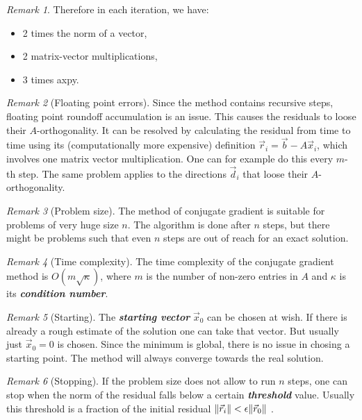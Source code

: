 \documentclass{article}
\theoremstyle{plain} %
\theoremstyle{remark} %
\newtheorem*{remark}{Remark} %
\def\df#1{\textbf{\textit{#1}}}
\numberwithin{equation}{section}
\begin{document}
\begin{remark}
    Therefore in each iteration, we have:
    \begin{itemize}
        \item 2 times the norm of a vector,
        \item 2 matrix-vector multiplications,
        \item 3 times axpy.\footnotemark
    \end{itemize}
\end{remark}

\begin{remark}[Floating point errors]
    Since the method contains recursive steps, floating point roundoff accumulation is an issue. This causes the residuals to loose their $A$-orthogonality. It can be resolved by calculating the residual from time to time using its (computationally more expensive) definition $\vec{r}_i = \vec{b} - A \vec{x}_i$, which involves one matrix vector multiplication. One can for example do this every $m$-th step. The same problem applies to the directions $\vec{d}_i$ that loose their $A$-orthogonality.
\end{remark}

\begin{remark}[Problem size]
    The method of conjugate gradient is suitable for problems of very huge size $n$. The algorithm is done after $n$ steps, but there might be problems such that even $n$ steps are out of reach for an exact solution.
\end{remark}

\begin{remark}[Time complexity]
    The time complexity of the conjugate gradient method is $O(m \sqrt{\kappa})$, where $m$ is the number of non-zero entries in $A$ and $\kappa$ is its \df{condition number}.
\end{remark}

\begin{remark}[Starting]
    The \df{starting vector} $\vec{x}_0$ can be chosen at wish. If there is already a rough estimate of the solution one can take that vector. But usually just $\vec{x}_0 = 0$ is chosen. Since the minimum is global, there is no issue in chosing a starting point. The method will always converge towards the real solution.
\end{remark}

\begin{remark}[Stopping]
    If the problem size does not allow to run $n$ steps, one can stop when the norm of the residual falls below a certain \df{threshold} value. Usually this threshold is a fraction of the initial residual $\norm{\vec{r}_i} < \epsilon \norm{\vec{r}_0}$ \cite{shewchuk1994}.
\end{remark}
\end{document}
